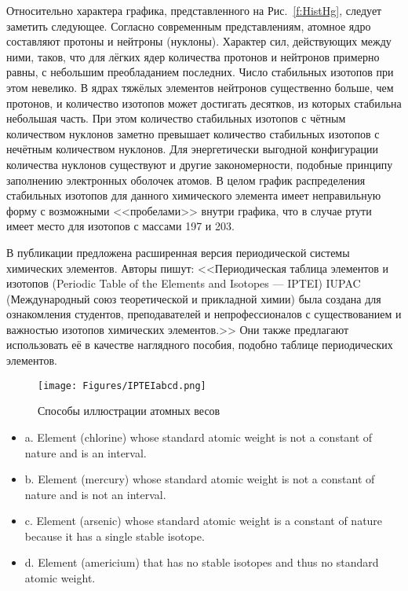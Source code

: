 \documentclass[a5paper,openany]{book}
\begin{document}
Относительно характера графика, представленного на Рис.~\ref{f:HistHg}, следует заметить следующее. Согласно современным представлениям, атомное ядро составляют протоны и нейтроны (нуклоны). Характер сил, действующих между ними, таков, что для лёгких ядер количества протонов и нейтронов примерно равны, с небольшим преобладанием последних. Число стабильных изотопов при этом невелико.  В ядрах тяжёлых элементов нейтронов существенно больше, чем протонов, и количество изотопов может достигать десятков, из которых стабильна небольшая часть. При этом количество стабильных  изотопов с чётным количеством нуклонов заметно превышает количество стабильных  изотопов с нечётным количеством нуклонов. Для энергетически выгодной конфигурации количества нуклонов существуют и другие закономерности, подобные принципу заполнению электронных оболочек атомов. В целом график распределения стабильных изотопов для данного химического элемента имеет неправильную форму с возможными <<пробелами>> внутри графика, что в случае ртути имеет место для изотопов с массами 197 и 203.

В публикации \cite{IUPAC} предложена расширенная версия периодической  системы химических элементов.
Авторы пишут:   
<<Периодическая таблица элементов и изотопов (Periodic Table of the Elements and Isotopes --- IPTEI) IUPAC (Международный союз теоретической и прикладной химии) была создана для ознакомления студентов, преподавателей и непрофессионалов с существованием и важностью изотопов химических элементов.>> Они также предлагают использовать её в качестве наглядного пособия, подобно таблице периодических элементов.

\begin{figure}[ht] 
	\centering\small
	\unitlength=1mm
	\texttt{[image: Figures/IPTEIabcd.png]} 
	\caption{Способы иллюстрации атомных весов} 
	\label{f:IPTEIabcd}
\end{figure}
\begin{itemize}
	\item a. Element (chlorine)	whose standard atomic weight is not a constant of nature and is an interval.
	\item  b. Element (mercury) whose standard atomic weight is not a constant of nature and is not an interval.
	\item  c. Element (arsenic) whose standard atomic weight is a constant of nature because it has a single
	stable isotope. 
	\item d. Element (americium) that has no stable isotopes and thus no standard atomic weight.
\end{itemize}
\end{document}

